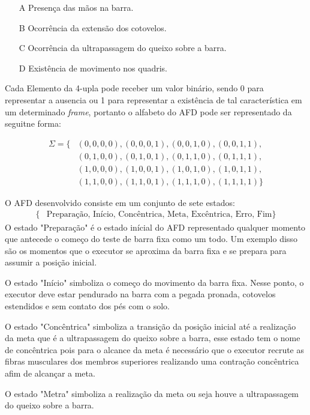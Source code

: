 \begin{itemize}
    \item[A] Presença das mãos na barra.
    \item[B] Ocorrência da extensão dos cotovelos.
    \item[C] Ocorrência da ultrapassagem do queixo sobre a barra.
    \item[D] Existência de movimento nos quadris.
\end{itemize} \label{lst:caracter}

Cada Elemento da 4-upla pode receber um valor binário, sendo 0 para representar a ausencia  ou 1 para representar a existência de tal característica em um determinado \textit{frame}, portanto o alfabeto do \ac{AFD} pode ser representado da seguitne forma:


\[
\begin{aligned}
\Sigma = \{ &(0, 0, 0, 0), (0, 0, 0, 1), (0, 0, 1, 0), (0, 0, 1, 1), \\
            &(0, 1, 0, 0), (0, 1, 0, 1), (0, 1, 1, 0), (0, 1, 1, 1), \\
            &(1, 0, 0, 0), (1, 0, 0, 1), (1, 0, 1, 0), (1, 0, 1, 1), \\
            &(1, 1, 0, 0), (1, 1, 0, 1), (1, 1, 1, 0), (1, 1, 1, 1) \}
\end{aligned}
\]

O \ac{AFD} desenvolvido consiste em um conjunto de sete estados:
\[
\begin{aligned}
\{ &\text{Preparação, Início, Concêntrica, Meta, Excêntrica, Erro, Fim} \}
\end{aligned}
\]
O estado "Preparação" é o estado inícial do \ac{AFD} representado qualquer momento que antecede o começo do teste de barra fixa como um todo. Um exemplo disso são os momentos que o executor se aproxima da barra fixa e se prepara para assumir a posição inicial.

O estado "Início" simboliza o começo do movimento da barra fixa. Nesse ponto, o executor deve estar pendurado na barra com a pegada pronada, cotovelos estendidos e sem contato dos pés com o solo.

O estado "Concêntrica" simboliza a transição da posição inicial até a realização da meta que é a ultrapassagem do queixo sobre a barra, esse estado tem o nome de concêntrica pois para o alcance da meta é necessário que o executor recrute as fibras musculares dos membros superiores  realizando  uma contração concêntrica afim de alcançar a meta.

O estado "Metra" simboliza a realização da meta ou seja houve a ultrapassagem do queixo sobre a barra.

